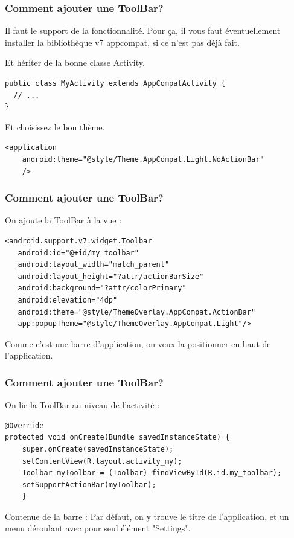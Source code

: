 \documentclass{beamer}
\begin{document}
\begin{frame}[fragile]
\frametitle{Comment ajouter une ToolBar?}

\begin{block}{Il faut le support de la fonctionnalité.}
Pour ça, il vous faut éventuellement installer la bibliothèque v7 appcompat, si ce n'est pas déjà fait.
\end{block}
\pause
\begin{block}{Et hériter de la bonne classe Activity.}
\begin{lstlisting}
public class MyActivity extends AppCompatActivity {
  // ...
}
\end{lstlisting}
\pause
\begin{block}{Et choisissez le bon thème.}
\lstset{language=xml}
\begin{lstlisting}
<application
    android:theme="@style/Theme.AppCompat.Light.NoActionBar"
    />
\end{lstlisting}
\lstset{language=java}
\end{block}
\end{block}
\end{frame}


\begin{frame}[fragile]
\frametitle{Comment ajouter une ToolBar?}

\begin{block}{On ajoute la ToolBar à la vue :}
\lstset{language=xml}
\begin{lstlisting}
<android.support.v7.widget.Toolbar
   android:id="@+id/my_toolbar"
   android:layout_width="match_parent"
   android:layout_height="?attr/actionBarSize"
   android:background="?attr/colorPrimary"
   android:elevation="4dp"
   android:theme="@style/ThemeOverlay.AppCompat.ActionBar"
   app:popupTheme="@style/ThemeOverlay.AppCompat.Light"/>
\end{lstlisting}
\lstset{language=java}
\end{block}
\begin{block}{}
Comme c'est une barre d'application, on veux la positionner en haut de l'application.
\end{block}
\end{frame}

\begin{frame}[fragile]
\frametitle{Comment ajouter une ToolBar?}

\begin{block}{On lie la ToolBar au niveau de l'activité :}
\lstset{language=java}
\begin{lstlisting}
@Override
protected void onCreate(Bundle savedInstanceState) {
    super.onCreate(savedInstanceState);
    setContentView(R.layout.activity_my);
    Toolbar myToolbar = (Toolbar) findViewById(R.id.my_toolbar);
    setSupportActionBar(myToolbar);
    }
\end{lstlisting}
\lstset{language=java}
\end{block}
\begin{exampleblock}{Contenue de la barre :}
Par défaut, on y trouve le titre de l'application, et un menu déroulant avec pour seul élément "Settings".
\end{exampleblock}
\end{frame}
\end{document}
